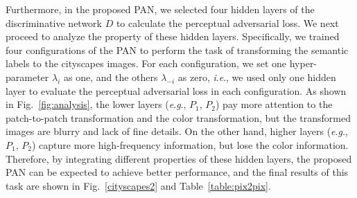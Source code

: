 \documentclass{article}
\newcommand{\ie}{\textit{i}.\textit{e}.}
\newcommand{\eg}{\textit{e}.\textit{g}.}
\begin{document}
Furthermore, in the proposed PAN, we selected four hidden layers of the discriminative network $D$ to calculate the perceptual adversarial loss. We next proceed to analyze the property of these hidden layers.  Specifically, we trained four configurations of the PAN to perform the task of transforming the semantic labels to the cityscapes images. For each configuration, we set one hyper-parameter $\lambda_i$ as one, and the others $\lambda_{-i}$ as zero, \ie,  
we used only one hidden layer to evaluate the perceptual adversarial loss in each configuration. As shown in Fig.~\ref{fig:analysis}, the lower layers (\eg, $P_1$, $P_2$) pay more
attention to the patch-to-patch transformation and the color transformation, but the transformed images are blurry and lack of fine details. On the other hand, higher layers (\eg, $P_1$, $P_2$) capture more high-frequency information, but lose the color information. Therefore, by integrating different properties of these hidden layers, the proposed PAN can be expected to achieve better performance, and the final results of this task are shown in Fig.~\ref{cityscapes2} and Table~\ref{table:pix2pix}.
\end{document}

